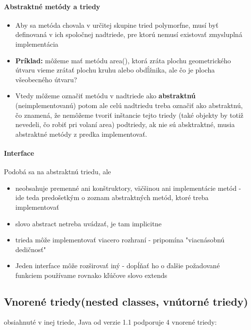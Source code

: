 		\paragraph{Abstraktné metódy a triedy}
		\begin{itemize}
			\item Aby sa metóda chovala v určitej skupine tried polymorfne, musí byť definovaná v ich spoločnej nadtriede, pre ktorú nemusí existovať zmysluplná implementácia
			\item\textbf{Príklad:} môžeme mať metódu area(), ktorá zráta plochu geometrického útvaru vieme zrátať plochu kruhu alebo obdĺžnika, ale čo je plocha všeobecného útvaru? 
			\item Vtedy môžeme označiť metódu v nadtriede ako \textbf{abstraktnú} (neimplementovanú) potom ale celú nadtriedu treba označiť ako abstraktnú, čo znamená, že nemôžeme tvoriť inštancie tejto triedy (také objekty by totiž nevedeli, čo robiť pri volaní area) podtriedy, ak nie sú absktraktné, musia abstraktné metódy z predka implementovať.
		\end{itemize}
		\paragraph{Interface}
		Podobá sa na abstraktnú triedu, ale 
			\begin{itemize}
				\item neobsahuje premenné ani konštruktory, väčšinou ani implementácie metód - ide teda predošetkým o zoznam abstraktných metód, ktoré treba implementovať
				\item slovo abstract netreba uvádzať, je tam implicitne
				\item trieda môže implementovať viacero rozhraní - pripomína "viacnásobnú dedičnosť"
				\item Jeden interface môže rozširovať iný - dopĺňať ho o ďalšie požadované funkciem používame rovnako kľúčove slovo extends
			\end{itemize}

	\subsection{Vnorené triedy(nested classes, vnútorné triedy)}

obsiahnuté v inej triede, Java od verzie 1.1 podporuje 4 vnorené triedy:\\

